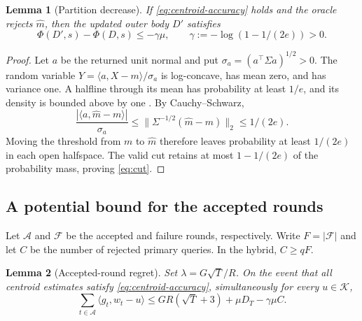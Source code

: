 \documentclass[11pt]{article}
\newcommand{\K}{\mathcal K}
\newcommand{\ip}[2]{\langle #1,#2\rangle}
\newcommand{\norm}[1]{\lVert #1\rVert}
\newtheorem{lemma}[lemma]{Lemma}
\theoremstyle{definition}
\begin{document}
\begin{lemma}[Partition decrease]\label{lem:cut}
If \eqref{eq:centroid-accuracy} holds and the oracle rejects $\widehat m$,
then the updated outer body $D'$ satisfies
\begin{equation}\label{eq:cut}
 \Phi(D',s)-\Phi(D,s)\le-\gamma\mu,
 \qquad \gamma:=-\log(1-1/(2e))>0.
\end{equation}
\end{lemma}

\begin{proof}
Let $a$ be the returned unit normal and put
$\sigma_a=(a^\top\Sigma a)^{1/2}>0$.
The random variable $Y=\ip{a}{X-m}/\sigma_a$ is log-concave, has mean zero,
and has variance one. A halfline through its mean has probability at least
$1/e$, and its density is bounded above by one
\cite[Lemmas~5.4 and~5.5]{lovaszvempala2007}.
By Cauchy--Schwarz,
\[
 \frac{|\ip{a}{\widehat m-m}|}{\sigma_a}
 \le\norm{\Sigma^{-1/2}(\widehat m-m)}_2\le1/(2e).
\]
Moving the threshold from $m$ to $\widehat m$ therefore leaves probability
at least $1/(2e)$ in each open halfspace. The valid cut retains at most
$1-1/(2e)$ of the probability mass, proving \eqref{eq:cut}.
\end{proof}

\subsection{A potential bound for the accepted rounds}

Let $\mathcal A$ and $\mathcal F$ be the accepted and failure rounds,
respectively. Write $F=|\mathcal F|$ and let $C$ be the number of rejected
primary queries. In the hybrid, $C\ge qF$.

\begin{lemma}[Accepted-round regret]\label{lem:accepted}
Set $\lambda=G\sqrt T/R$. On the event that all centroid estimates satisfy
\eqref{eq:centroid-accuracy}, simultaneously for every $u\in\K$,
\begin{equation}\label{eq:accepted}
 \sum_{t\in\mathcal A}\ip{g_t}{w_t-u}
 \le GR(\sqrt T+3)+\mu D_T-\gamma\mu C.
\end{equation}
\end{lemma}
\end{document}
